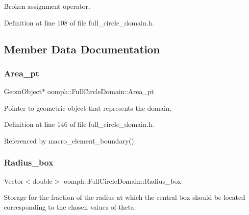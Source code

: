 Broken assignment operator. 



Definition at line 108 of file full\+\_\+circle\+\_\+domain.\+h.



\subsection{Member Data Documentation}
\mbox{\label{classoomph_1_1FullCircleDomain_a49eca6b304caf0840bd99bd18a9a32cd}} 
\subsubsection{\texorpdfstring{Area\+\_\+pt}{Area\_pt}}
{\footnotesize\ttfamily Geom\+Object$\ast$ oomph\+::\+Full\+Circle\+Domain\+::\+Area\+\_\+pt\hspace{0.3cm}{\ttfamily [private]}}



Pointer to geometric object that represents the domain. 



Definition at line 146 of file full\+\_\+circle\+\_\+domain.\+h.



Referenced by macro\+\_\+element\+\_\+boundary().

\mbox{\label{classoomph_1_1FullCircleDomain_a96d5b35a7b41251a033d923afc953636}} 
\subsubsection{\texorpdfstring{Radius\+\_\+box}{Radius\_box}}
{\footnotesize\ttfamily Vector$<$double$>$ oomph\+::\+Full\+Circle\+Domain\+::\+Radius\+\_\+box\hspace{0.3cm}{\ttfamily [private]}}

Storage for the fraction of the radius at which the central box should be located corresponding to the chosen values of theta. 

